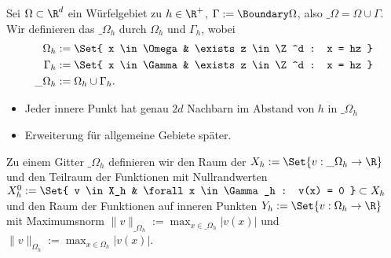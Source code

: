 \begin{df}[FD-Gitter] \label{2.5}
	Sei $\Omega \subset \R^d$ ein Würfelgebiet zu $h \in \R^+$, $\Gamma := \Boundary \Omega$, also $\_\Omega = \Omega \cup \Gamma$.
	Wir definieren das  $\_\Omega_h$ durch  $\Omega_h$ und  $\Gamma_h$, wobei
	\begin{align*}
		\Omega_h &:= \Set{ x \in \Omega & \exists z \in \Z^d : x = hz } \\
		\Gamma_h &:= \Set{ x \in \Gamma & \exists z \in \Z^d : x = hz } \\
		\_\Omega_h &:= \Omega_h \cup \Gamma_h.
	\end{align*}
	\begin{note}
		\begin{itemize}
			\item
				Jeder innere Punkt hat genau $2d$ Nachbarn im Abstand von $h$ in $\_\Omega_h$
			\item
				Erweiterung für allgemeine Gebiete später.
		\end{itemize}
	\end{note}
\end{df}

\begin{df}[Gitterfunktionen] \label{2.6}
	Zu einem Gitter $\_\Omega_h$ definieren wir den Raum der  $X_h := \Set{ v : \_\Omega_h \to \R }$
	und den Teilraum der Funktionen mit Nullrandwerten $X_h^0 := \Set{ v \in X_h & \forall x \in \Gamma_h : v(x) = 0 } \subset X_h$
	und den Raum der Funktionen auf inneren Punkten $Y_h := \Set{v: \Omega_h \to \R}$ mit Maximumsnorm $\|v\|_{\_\Omega_h} := \max_{x\in \_\Omega_h} |v(x)|$ und $\|v\|_{\Omega_h} := \max_{x\in\Omega_h} |v(x)|$.
\end{df}

